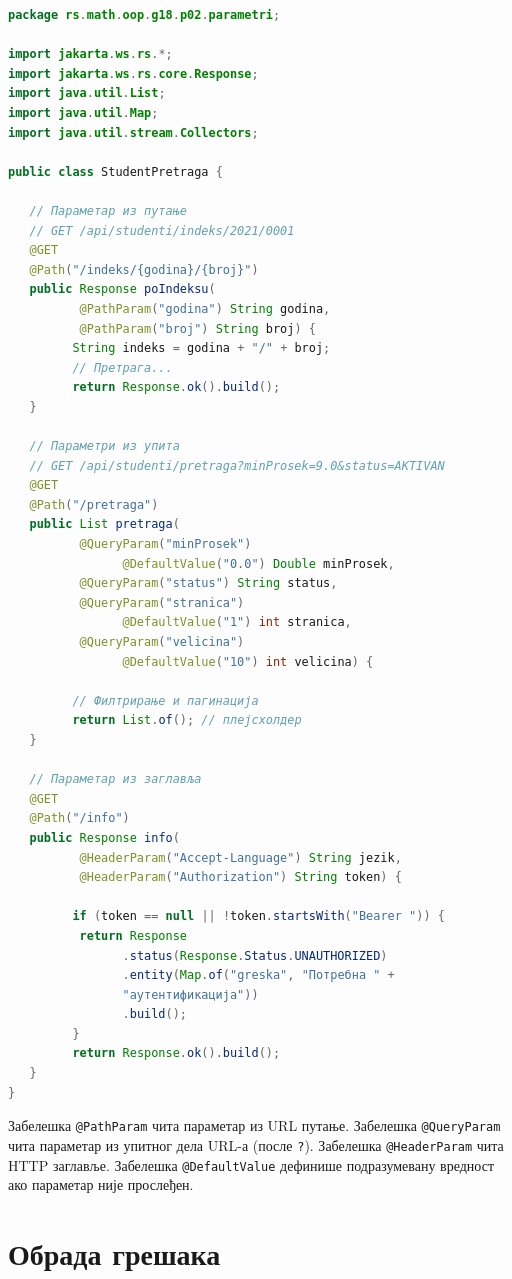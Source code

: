 \begin{lstlisting}[language=Java]
package rs.math.oop.g18.p02.parametri;
 
import jakarta.ws.rs.*;
import jakarta.ws.rs.core.Response;
import java.util.List;
import java.util.Map;
import java.util.stream.Collectors;
 
public class StudentPretraga {
 
   // Параметар из путање
   // GET /api/studenti/indeks/2021/0001
   @GET
   @Path("/indeks/{godina}/{broj}")
   public Response poIndeksu(
          @PathParam("godina") String godina,
          @PathParam("broj") String broj) {
         String indeks = godina + "/" + broj;
         // Претрага...
         return Response.ok().build();
   }
 
   // Параметри из упита
   // GET /api/studenti/pretraga?minProsek=9.0&status=AKTIVAN
   @GET
   @Path("/pretraga")
   public List pretraga(
          @QueryParam("minProsek")
                @DefaultValue("0.0") Double minProsek,
          @QueryParam("status") String status,
          @QueryParam("stranica")
                @DefaultValue("1") int stranica,
          @QueryParam("velicina")
                @DefaultValue("10") int velicina) {
 
         // Филтрирање и пагинација
         return List.of(); // плејсхолдер
   }
 
   // Параметар из заглавља
   @GET
   @Path("/info")
   public Response info(
          @HeaderParam("Accept-Language") String jezik,
          @HeaderParam("Authorization") String token) {
 
         if (token == null || !token.startsWith("Bearer ")) {
          return Response
                .status(Response.Status.UNAUTHORIZED)
                .entity(Map.of("greska", "Потребна " +
                "аутентификација"))
                .build();
         }
         return Response.ok().build();
   }
}
\end{lstlisting}


Забелешка \texttt{@PathParam} чита параметар из URL путање. Забелешка \texttt{@QueryParam} чита параметар из упитног дела URL-а (после \texttt{?}). Забелешка \texttt{@HeaderParam} чита HTTP заглавље. Забелешка \texttt{@DefaultValue} дефинише подразумевану вредност ако параметар није прослеђен.


\section{Обрада грешака}

